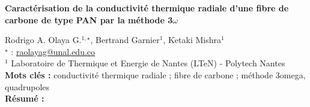 


    \newpage


%
\begin{flushleft}
\addtocounter{section}{1}
{\Large \textbf{Caractérisation de la conductivité thermique radiale d'une fibre de carbone de type PAN par la méthode 3$\omega$}}\label{ref:2}
\end{flushleft}
%
Rodrigo A. Olaya G.$^{1,\star}$, Bertrand Garnier$^{1}$, Ketaki Mishra$^{1}$\\[2mm]
$^{\star}$ \Letter : \url{raolayag@unal.edu.co}\\[2mm]
{\footnotesize $^{1}$ Laboratoire de Thermique et Energie de Nantes (LTeN)  - Polytech Nantes}\\
[4mm]
%
\noindent \textbf{Mots clés : } conductivité thermique radiale ; fibre de carbone ; méthode 3omega, quadrupoles\\[4mm]
%
\noindent \textbf{Résumé : } 


